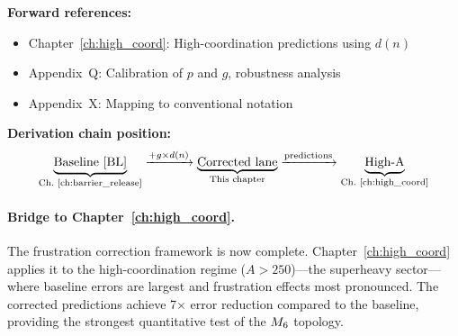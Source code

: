 \bigskip
\noindent
\textbf{Forward references:}
\begin{itemize}
    \item Chapter~\ref{ch:high_coord}: High-coordination predictions using $d(n)$
    \item Appendix~Q: Calibration of $p$ and $g$, robustness analysis
    \item Appendix~X: Mapping to conventional notation
\end{itemize}

\bigskip
\noindent
\textbf{Derivation chain position:}
\begin{equation*}
    \underbrace{\text{Baseline [BL]}}_{\text{Ch.~\ref{ch:barrier_release}}}
    \xrightarrow{+ g \times d(n)}
    \underbrace{\text{Corrected lane}}_{\text{This chapter}}
    \xrightarrow{\text{predictions}}
    \underbrace{\text{High-A}}_{\text{Ch.~\ref{ch:high_coord}}}
\end{equation*}

\paragraph{Bridge to Chapter~\ref{ch:high_coord}.}
The frustration correction framework is now complete. Chapter~\ref{ch:high_coord}
applies it to the high-coordination regime ($A > 250$)---the superheavy
sector---where baseline errors are largest and frustration effects most
pronounced. The corrected predictions achieve 7$\times$ error reduction
compared to the baseline, providing the strongest quantitative test of
the $M_6$ topology.

